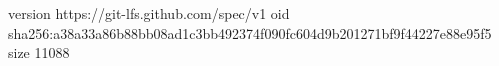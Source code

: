 version https://git-lfs.github.com/spec/v1
oid sha256:a38a33a86b88bb08ad1c3bb492374f090fc604d9b201271bf9f44227e88e95f5
size 11088
